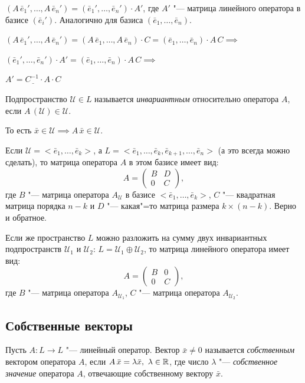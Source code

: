 $(A\, \bar{e}_1', \ldots, A\, \bar{e}_n') = (\bar{e}_1', \ldots, \bar{e}_n') \cdot A'$, где $A'$ "--- матрица линейного оператора в базисе $(\bar{e}_i')$. Аналогично для базиса $(\bar{e}_1, \ldots, \bar{e}_n)$.

$(A\, \bar{e}_1', \ldots, A\, \bar{e}_n') = (A\, \bar{e}_1, \ldots, A\, \bar{e}_n) \cdot C = (\bar{e}_1, \ldots, \bar{e}_n) \cdot A\, C \implies$

$(\bar{e}_1', \ldots, \bar{e}_n') \cdot A' = (\bar{e}_1, \ldots, \bar{e}_n) \cdot A\, C \implies$

$\underline{A' = C^{-1} \cdot A \cdot C}$

\begin{definition}
  Подпространство $\mathcal{U} \in L$ называется \textit{инвариантным} относительно оператора $A$, если $A\,(\mathcal{U}) \in \mathcal{U}$.

  То есть $\bar{x} \in \mathcal{U} \implies A\, \bar{x} \in \mathcal{U}$.
\end{definition}

Если $\mathcal{U} = <\! \bar{e}_1, \ldots, \bar{e}_k \!>$, а $L =  <\! \bar{e}_1, \ldots, \bar{e}_k, \bar{e}_{k + 1}, \ldots, \bar{e}_n\!>$ (а это всегда можно сделать), то матрица оператора $A$ в этом базисе имеет вид:
$$
A = \begin{pmatrix}
  B & D\\
  0 & C
\end{pmatrix},
$$
где $B$ "--- матрица оператора $A_\mathcal{U}$ в базисе $<\! \bar{e}_1, \ldots, \bar{e}_k \!>$, $C$ "--- квадратная матрица порядка $n - k$ и $D$ "--- какая"=то матрица размера $k \times (n - k)$. Верно и обратное.

Если же пространство $L$ можно разложить на сумму двух инвариантных подпространств $\mathcal{U}_1$ и $\mathcal{U}_2$: $L = \mathcal{U}_1 \oplus \mathcal{U}_2$, то матрица линейного оператора имеет вид:
$$
A = \begin{pmatrix}
  B & 0 \\
  0 & C
\end{pmatrix},
$$
где $B$ "--- матрица оператора $A_{\mathcal{U}_1}$, $C$ "--- матрица оператора $A_{\mathcal{U}_2}$.

\subsection*{Собственные векторы}
\begin{definition}
  Пусть $A: L \to L$ "--- линейный оператор. Вектор $\bar{x} \neq 0$ называется \textit{собственным} вектором оператора $A$, если $A\, \bar{x} = \lambda \bar{x}, ~ \lambda \in \mathbb{R}$, где число $\lambda$ "--- \textit{собственное значение} оператора $A$, отвечающие собственному вектору $\bar{x}$.
\end{definition}

